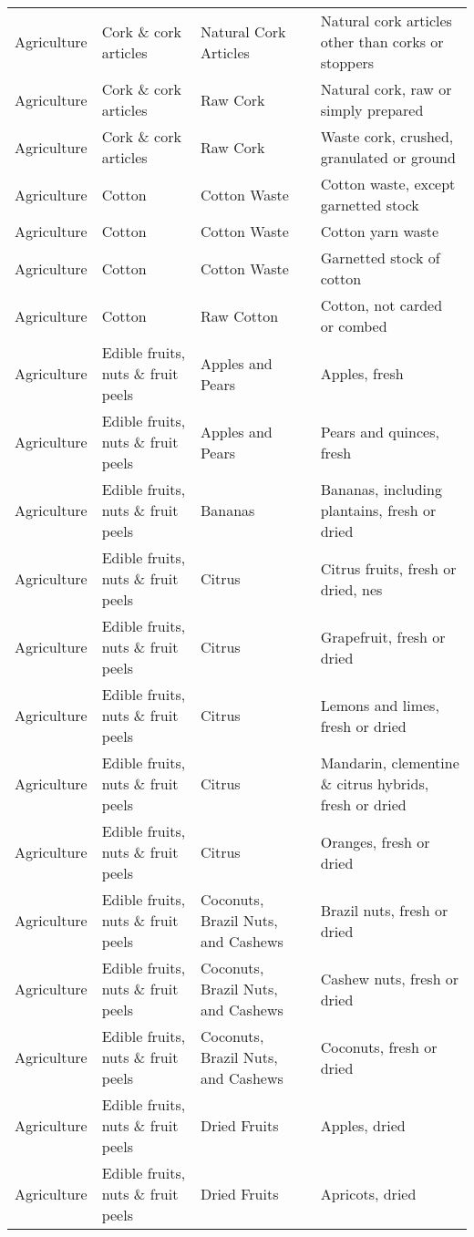 \begin{appendices}
\begin{xltabular}{\textwidth}{|p{0.07\textwidth}|p{0.28\textwidth}|p{0.24\textwidth}|p{0.31\textwidth}|}
	Agriculture & Cork \& cork articles & Natural Cork Articles & Natural cork articles other than corks or stoppers \\
	Agriculture & Cork \& cork articles & Raw Cork & Natural cork, raw or simply prepared \\
	Agriculture & Cork \& cork articles & Raw Cork & Waste cork, crushed, granulated or ground \\
	Agriculture & Cotton & Cotton Waste & Cotton waste, except garnetted stock \\
	Agriculture & Cotton & Cotton Waste & Cotton yarn waste \\
	Agriculture & Cotton & Cotton Waste & Garnetted stock of cotton \\
	Agriculture & Cotton & Raw Cotton & Cotton, not carded or combed \\
	Agriculture & Edible fruits, nuts \& fruit peels & Apples and Pears & Apples, fresh \\
	Agriculture & Edible fruits, nuts \& fruit peels & Apples and Pears & Pears and quinces, fresh \\
	Agriculture & Edible fruits, nuts \& fruit peels & Bananas & Bananas, including plantains, fresh or dried \\
	Agriculture & Edible fruits, nuts \& fruit peels & Citrus & Citrus fruits, fresh or dried, nes \\
	Agriculture & Edible fruits, nuts \& fruit peels & Citrus & Grapefruit, fresh or dried \\
	Agriculture & Edible fruits, nuts \& fruit peels & Citrus & Lemons and limes, fresh or dried \\
	Agriculture & Edible fruits, nuts \& fruit peels & Citrus & Mandarin, clementine \& citrus hybrids, fresh or dried \\
	Agriculture & Edible fruits, nuts \& fruit peels & Citrus & Oranges, fresh or dried \\
	Agriculture & Edible fruits, nuts \& fruit peels & Coconuts, Brazil Nuts, and Cashews & Brazil nuts, fresh or dried \\
	Agriculture & Edible fruits, nuts \& fruit peels & Coconuts, Brazil Nuts, and Cashews & Cashew nuts, fresh or dried \\
	Agriculture & Edible fruits, nuts \& fruit peels & Coconuts, Brazil Nuts, and Cashews & Coconuts, fresh or dried \\
	Agriculture & Edible fruits, nuts \& fruit peels & Dried Fruits & Apples, dried \\
	Agriculture & Edible fruits, nuts \& fruit peels & Dried Fruits & Apricots, dried \\

\end{xltabular}
\end{appendices}
